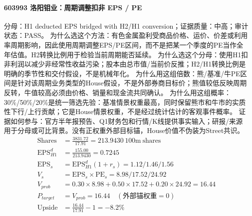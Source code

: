 \paragraph{603993 洛阳钼业：周期调整扣非 EPS / PE}
分母：H1 deducted EPS bridged with H2/H1 conversion；证据质量：中高；审计状态：PASS。
为什么选这个方法：有色金属盈利受商品价格、运价、价差或利用率周期影响，因此使用周期调整EPS/PE区间，而不是把某一个季度的PE当作全年估值。H2转换比例用于检验当前周期能否延续。
为什么选这个分母：使用H1扣非利润以减少非经常性收益污染；股本由总市值/当前价反推；H2/H1转换比例是明确的季节性和交付假设，不是机械年化。
为什么用这组倍数：熊/基准/牛PE区间是针对该周期业务类型的House假设，不是外部券商目标价；熊值较低反映周期反转，牛值较高必须由价格、销量和现金流共同确认。
为什么用这组概率：30\%/50\%/20\%是统一筛选先验：基准情景权重最高，同时保留熊市和牛市的实质性下行/上行贡献；它是House情景权重，不是经过统计估计的客观事件概率。
证据如何参与：官方半年报预告、Q1财务包和行情/K线提供事实输入；研报/来源用于分母或可比背景。没有正权重外部目标锚，House价值不伪装为Street共识。
\begin{align*}
\mathrm{Shares} &= \frac{3831.72}{17.91}=213.9430\ \mathrm{100m\ shares}\\
\mathrm{EPS}_{H1}^d &= \frac{155.00}{213.9430}=0.7245\\
\mathrm{EPS}_s &= \mathrm{EPS}_{H1}^d(1+r_s)=1.12/1.46/1.56\\
V_s &= \mathrm{EPS}_s\times \mathrm{PE}_s=8.98/17.52/24.92\\
V_{prob} &= 0.30\times 8.98+0.50\times 17.52+0.20\times 24.92=16.44\\
P_{target} &= V_{prob}=16.44\quad(\text{外部锚权重}=0)\\
\mathrm{Upside} &= \frac{16.44}{17.91}-1=-8.2\%\\
\end{align*}

